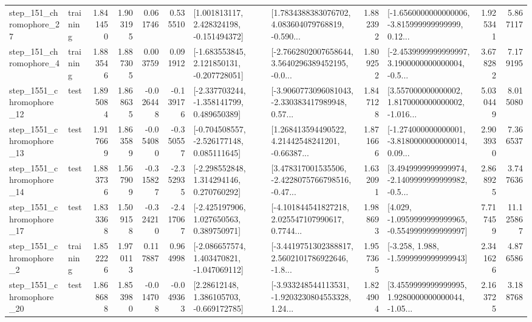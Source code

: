 \begin{tabular}{llrrrrllrlrr}
  step\_151\_chromophore\_27 &  training &      1.841450 &    1.903195 &      0.061746 &  0.535510 &    [1.001813117, 2.428324198, -0.151494372] &  [1.7834388383076702, 4.083604079768819, -0.590... &       1.882392 &  [-1.6560000000000006, -3.815999999999999, 0.12... &            1.925341 &          5.867117 \\
   step\_151\_chromophore\_4 &  training &      1.883546 &    1.887305 &      0.003759 &  0.091912 &   [-1.683553845, 2.121850131, -0.207728051] &  [-2.7662802007658644, 3.5640296389452195, -0.0... &       1.809252 &  [-2.4539999999999997, 3.1900000000000004, -0.5... &            3.678282 &          7.179195 \\
 step\_1551\_chromophore\_12 &      test &      1.895084 &    1.868635 &     -0.026448 & -0.139176 &   [-2.337703244, -1.358141799, 0.489650389] &  [-3.9060773096081043, -2.330383417989948, 0.57... &       1.847128 &  [3.557000000000002, 1.8170000000000002, -1.016... &            5.030449 &          8.015080 \\
 step\_1551\_chromophore\_13 &      test &      1.917669 &    1.863589 &     -0.054080 & -0.350557 &   [-0.704508557, -2.526177148, 0.085111645] &  [1.268413594490522, 4.21442548241201, -0.66387... &       1.871666 &  [-1.274000000000001, -3.8180000000000014, 0.09... &            2.903930 &          7.366537 \\
 step\_1551\_chromophore\_14 &      test &      1.883736 &    1.567909 &     -0.315827 & -2.352935 &    [-2.298552848, 1.314294146, 0.270760292] &  [3.478317001535506, -2.4228075766798516, -0.47... &       1.632091 &  [3.4949999999999974, -2.1409999999999982, -0.5... &            2.868925 &          3.747636 \\
 step\_1551\_chromophore\_17 &      test &      1.833368 &    1.509158 &     -0.324210 & -2.417067 &    [-2.425197906, 1.027650563, 0.389750971] &  [-4.101844541827218, 2.025547107990617, 0.7744... &       1.988693 &  [4.029, -1.0959999999999965, -0.5549999999999997] &            7.717459 &         11.125867 \\
  step\_1551\_chromophore\_2 &  training &      1.852226 &    1.970113 &      0.117887 &  0.964998 &   [-2.086657574, 1.403470821, -1.047069112] &  [-3.4419751302388817, 2.5602101786922646, -1.8... &       1.957365 &               [-3.258, 1.988, -1.5999999999999943] &            2.341626 &          4.876586 \\
 step\_1551\_chromophore\_20 &      test &      1.868688 &    1.853980 &     -0.014708 & -0.049363 &     [2.28612148, 1.386105703, -0.669172785] &  [-3.933248544113531, -1.9203230804553328, 1.24... &       1.824904 &  [3.4559999999999995, 1.9280000000000044, -1.05... &            2.163725 &          3.188768 \\

\end{tabular}
